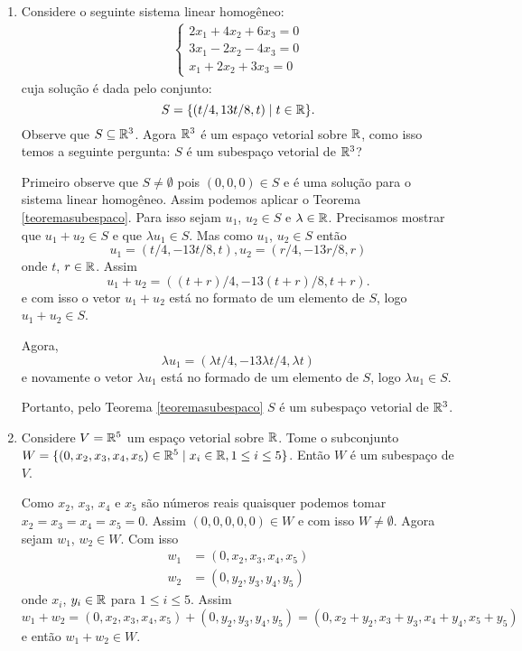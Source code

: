 \begin{exemplos}
  \begin{enumerate}[label={\arabic*})]
    \item Considere o seguinte sistema linear homogêneo:
      \begin{align}\label{exemplosistemahomogeneosubespaco}
        \begin{cases}
          2x_1 + 4x_2 + 6x_3 = 0\\
          3x_1 - 2x_2 - 4x_3 = 0\\
          x_1 + 2x_2 + 3x_3 = 0
        \end{cases}
      \end{align}
      cuja solução é dada pelo conjunto:
      \[
        S = \{(t/4,13t/8,t) \mid t \in \mathbb{R}\}.
      \]
      Observe que $S \subseteq \mathbb{R}^3$. Agora $\mathbb{R}^3$ é um espaço vetorial sobre $\mathbb{R}$, como isso temos a seguinte pergunta: $S$ é um subespaço vetorial de $\mathbb{R}^3$?
      \begin{solucao}
        Primeiro observe que $S \ne \emptyset$ pois $(0,0,0) \in S$ e é uma solução para o sistema linear homogêneo. Assim podemos aplicar o Teorema \ref{teoremasubespaco}. Para isso sejam $u_1$, $u_2 \in S$ e $\lambda \in \mathbb{R}$.
        Precisamos mostrar que $u_1 + u_2 \in S$ e que $\lambda u_1 \in S$. Mas como $u_1$, $u_2 \in S$ então
        \[
          u_1 = (t/4, -13t/8, t),
          u_2 = (r/4, -13r/8,r)
        \]
        onde $t$, $r \in \mathbb{R}$. Assim
        \[
          u_1 + u_2 = ((t + r)/4, -13(t + r)/8, t + r).
        \]
        e com isso o vetor $u_1 + u_2$ está no formato de um elemento de $S$, logo $u_1 + u_2 \in S$.

                Agora,
                \[
                    \lambda u_1 = (\lambda t/4, -13\lambda t/4, \lambda t)
                \]
          e novamente o vetor $\lambda u_1$ está no formado de um elemento de $S$, logo $\lambda u_1 \in S$.

                Portanto, pelo Teorema \ref{teoremasubespaco} $S$ é um subespaço vetorial de $\mathbb{R}^3$.
      \end{solucao}
  \item Considere $V = \mathbb{R}^5$ um espaço vetorial sobre $\mathbb{R}$. Tome o subconjunto $W = \{(0,x_2,x_3,x_4,x_5) \in \mathbb{R}^5 \mid x_i \in \mathbb{R}, 1 \le i \le 5\}$. Então $W$ é um subespaço de $V$.
    \begin{solucao}
      Como $x_2$, $x_3$, $x_4$ e $x_5$ são números reais quaisquer podemos tomar $x_2 = x_3 = x_4 = x_ 5 = 0$. Assim $(0, 0, 0, 0, 0) \in W$ e com isso $W \ne \emptyset$. Agora sejam $w_1$, $w_2 \in W$. Com isso
      \begin{align*}
        w_1 &= (0,x_2, x_3, x_4, x_5)\\
        w_2 &= (0,y_2, y_3, y_4, y_5)
      \end{align*}
      onde $x_i$, $y_i \in \mathbb{R}$ para $1 \le i \le 5$. Assim
      \[
        w_1 + w_2 = (0,x_2, x_3, x_4, x_5) + (0,y_2, y_3, y_4, y_5) = (0, x_2 + y_2, x_3 + y_3, x_4 + y_4, x_5 + y_5)
      \]
      e então $w_1 + w_2 \in W$.


\end{solucao}
\end{enumerate}
\end{exemplos}
